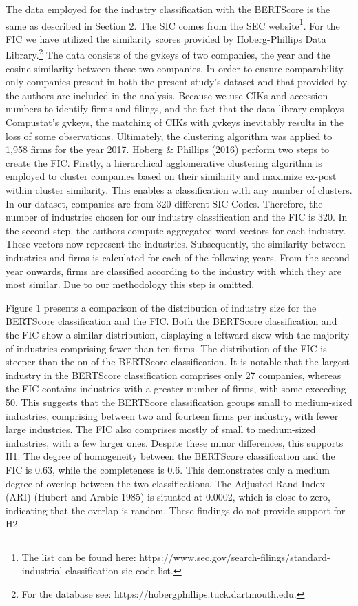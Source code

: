 \documentclass[
]{article}
\begin{document}
The data employed for the industry classification with the BERTScore is
the same as described in Section 2. The SIC comes from the SEC
website\footnote{The list can be found here:
  https://www.sec.gov/search-filings/standard-industrial-classification-sic-code-list.}.
For the FIC we have utilized the similarity scores provided by
Hoberg-Phillips Data Library.\footnote{For the database see:
  https://hobergphillips.tuck.dartmouth.edu.} The data consists of the
gvkeys of two companies, the year and the cosine similarity between
these two companies. In order to ensure comparability, only companies
present in both the present study's dataset and that provided by the
authors are included in the analysis. Because we use CIKs and accession
numbers to identify firms and filings, and the fact that the data
library employs Compustat's gvkeys, the matching of CIKs with gvkeys
inevitably results in the loss of some observations. Ultimately, the
clustering algorithm was applied to 1,958 firms for the year 2017.
Hoberg \& Phillips (2016) perform two steps to create the FIC. Firstly,
a hierarchical agglomerative clustering algorithm is employed to cluster
companies based on their similarity and maximize ex-post within cluster
similarity. This enables a classification with any number of clusters.
In our dataset, companies are from 320 different SIC Codes. Therefore,
the number of industries chosen for our industry classification and the
FIC is 320. In the second step, the authors compute aggregated word
vectors for each industry. These vectors now represent the industries.
Subsequently, the similarity between industries and firms is calculated
for each of the following years. From the second year onwards, firms are
classified according to the industry with which they are most similar.
Due to our methodology this step is omitted.

Figure 1 presents a comparison of the distribution of industry size for
the BERTScore classification and the FIC. Both the BERTScore
classification and the FIC show a similar distribution, displaying a
leftward skew with the majority of industries comprising fewer than ten
firms. The distribution of the FIC is steeper than the on of the
BERTScore classification. It is notable that the largest industry in the
BERTScore classification comprises only 27 companies, whereas the FIC
contains industries with a greater number of firms, with some exceeding
50. This suggests that the BERTScore classification groups small to
medium-sized industries, comprising between two and fourteen firms per
industry, with fewer large industries. The FIC also comprises mostly of
small to medium-sized industries, with a few larger ones. Despite these
minor differences, this supports H1. The degree of homogeneity between
the BERTScore classification and the FIC is 0.63, while the completeness
is 0.6. This demonstrates only a medium degree of overlap between the
two classifications. The Adjusted Rand Index (ARI) (Hubert and Arabie
1985) is situated at 0.0002, which is close to zero, indicating that the
overlap is random. These findings do not provide support for H2.
\end{document}
